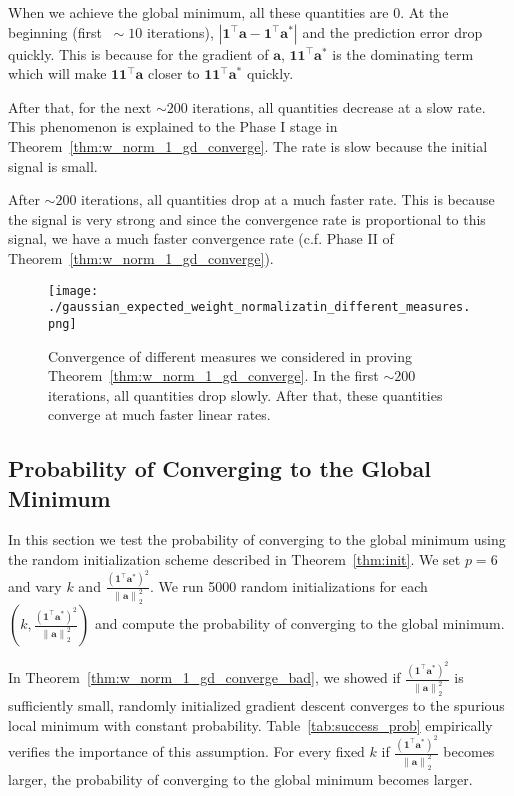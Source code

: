 \documentclass{article}
\newcommand{\secondlayer}{a}
\newcommand{\vect}[1]{\mathbf{#1}}
\newcommand{\norm}[1]{\left\|#1\right\|}
\newcommand{\abs}[1]{\left|#1\right|}
\begin{document}
When we achieve the global minimum, all these quantities are $0$.
At the beginning (first $~\sim 10$ iterations), $\abs{\vect{1}^\top \vect{\secondlayer}-\vect{1}^\top \vect{\secondlayer}^*}$ and the prediction error drop quickly.
This is because for the gradient of $\vect{\secondlayer}$, $\vect{1}\vect{1}^\top\vect{\secondlayer}^*$ is the dominating term which will make $\vect{1}\vect{1}^\top\vect{\secondlayer}$ closer to  $\vect{1}\vect{1}^\top\vect{\secondlayer}^*$ quickly.

After that, for the next $\sim 200$ iterations, all quantities decrease at a slow rate.
This phenomenon is explained to the Phase I stage in Theorem~\ref{thm:w_norm_1_gd_converge}.
The rate is slow because the initial signal is small.

After $\sim 200$ iterations, all quantities drop at a much faster rate.
This is because the signal is very strong and since the convergence rate is proportional to this signal, we have a much faster convergence rate (c.f. Phase II of Theorem~\ref{thm:w_norm_1_gd_converge}).

\begin{figure}[tb]
\centering
\texttt{[image: ./gaussian\_expected\_weight\_normalizatin\_different\_measures.png]}
	\caption{Convergence of different measures we considered in proving Theorem~\ref{thm:w_norm_1_gd_converge}.
	In the first $\sim200$ iterations, all quantities drop slowly.
	After that, these quantities converge at much faster linear rates.
}\label{fig:dynamics}
\end{figure}\subsection{Probability of Converging to the Global Minimum}
In this section we test the probability of converging to the global minimum using the random initialization scheme described in Theorem~\ref{thm:init}.
We set $p=6$ and vary $k$ and $\frac{(\vect{1}^\top\vect{\secondlayer}^*)^2}{\norm{\vect{\secondlayer}}_2^2}$.
We run 5000 random initializations for each $(k,\frac{(\vect{1}^\top\vect{\secondlayer}^*)^2}{\norm{\vect{\secondlayer}}_2^2})$ and compute the probability of converging to the global minimum.

In Theorem~\ref{thm:w_norm_1_gd_converge_bad}, we showed if $\frac{(\vect{1}^\top\vect{\secondlayer}^*)^2}{\norm{\vect{\secondlayer}}_2^2}$ is sufficiently small, randomly initialized gradient descent converges to the spurious local minimum with constant probability.
Table~\ref{tab:success_prob} empirically verifies the importance of this assumption.
For every fixed $k$ if  $\frac{(\vect{1}^\top\vect{\secondlayer}^*)^2}{\norm{\vect{\secondlayer}}_2^2}$ becomes larger, the probability of converging to the global minimum becomes larger.
\end{document}
